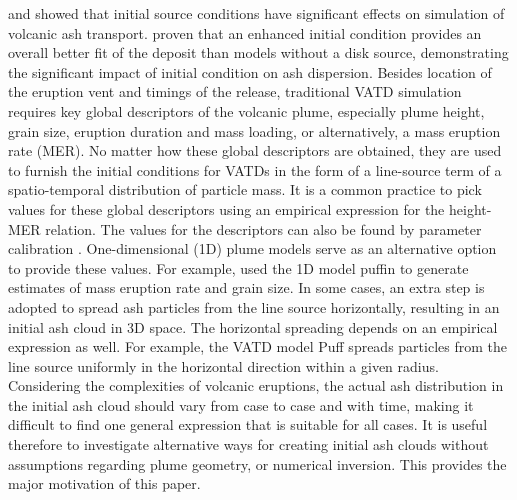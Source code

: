 \documentclass[utf8]{frontiersSCNS} %
\begin{document}
\citet{fero2009simulating} and \citet{stohl2011determination} showed that initial source conditions have significant effects on simulation of volcanic ash transport. \citet{constantinescu2021radius} proven that an enhanced initial condition provides an overall better fit of the deposit than models without a disk source, demonstrating the significant impact of initial condition on ash dispersion. Besides  location of the eruption vent and timings of the release, traditional VATD simulation requires key global descriptors of the volcanic plume, especially plume height, grain size, eruption duration and mass loading, or alternatively, a mass eruption rate (MER). No matter how these global descriptors are obtained, they are used to furnish the initial conditions for VATDs in the form of a line-source term of a spatio-temporal distribution of particle mass. It is a common practice to pick values for these global descriptors using an empirical expression for the height-MER relation. The values for the descriptors can also be found by parameter calibration \citep[e.g.][]{fero2008simulation,fero2009simulating, stohl2011determination, zidikheri2017estimation}. One-dimensional (1D) plume models serve as an alternative option to provide these values. For example, \citet{bursik2012estimation} used the 1D model puffin \citep{bursik2001effect} to generate estimates of mass eruption rate and grain size. In some cases, an extra step is adopted to spread ash particles from the line source horizontally, resulting in an initial ash cloud in 3D space. The horizontal spreading depends on an empirical expression as well. For example, the VATD model Puff spreads particles from the line source uniformly in the horizontal direction within a given radius. Considering the complexities of volcanic eruptions, the actual ash distribution in the initial ash cloud should vary from case to case and with time, making it difficult to find one general expression that is suitable for all cases. It is useful therefore to investigate alternative ways for creating initial ash clouds without assumptions regarding plume geometry, or numerical inversion. This provides the major motivation of this paper.
\end{document}
